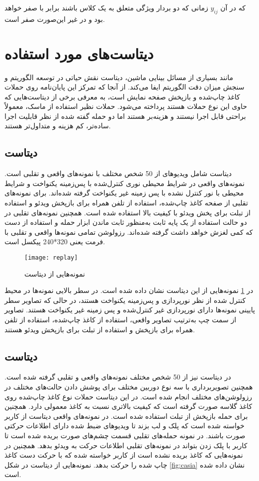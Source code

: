 که در آن 
$y_{ij}$
  زمانی که دو بردار ویژگی متعلق به یک کلاس باشند برابر با صفر خواهد بود و در غیر این‌صورت صفر است.
  \section{دیتاست‌های مورد استفاده}
  مانند بسیاری از مسائل بینایی ماشین، دیتاست نقش حیاتی در توسعه الگوریتم و سنجش میزان دقت الگوریتم ایفا می‌کند. از آنجا که تمرکز این پایان‌نامه روی حملات کاغذ چاپ‌شده و بازپخش صفحه نمایش است، به معرفی برخی از دیتاست‌هایی که حاوی این نوع حملات هستند پرداخته می‌شود. حملات نظیر استفاده از ماسک، معمولاً براحتی قابل اجرا نیستند و هزینه‌بر هستند اما دو حمله گفته شده از نظر قابلیت اجرا ساده‌تر، کم هزینه و متداول‌تر هستند. 
\subsection{دیتاست }
دیتاست
 \cite{chingovska2012effectiveness}
شامل ویدیوهای از 50 شخص مختلف با نمونه‌های واقعی و تقلبی است. نمونه‌های واقعی در شرایط محیطی نوری کنترل‌شده با پس‌زمینه یکنواخت و شرایط محیطی با نور کنترل نشده با پس زمینه غیر یکنواخت گرفته شده‌اند. برای نمونه‌های تقلبی از صفحه کاغذ چاپ‌شده، استفاده از تلفن همراه برای بازپخش ویدئو و استفاده از تبلت  برای پخش ویدئو با کیفیت بالا استفاده شده است. همچنین نمونه‌های تقلبی در دو حالت استفاده از یک پایه ثابت به‌منظور ثابت ماندن ابزار حمله و استفاده از دست که کمی لغزش خواهد داشت گرفته شده‌اند. رزولوشن تمامی نمونه‌ها واقعی و تقلبی با فرمت  یعنی 320*240 پیکسل است.
\begin{figure}[h]
 	\centerline{\texttt{[image: replay]}}
 	\caption{نمونه‌هایی از دیتاست  \cite{chingovska2012effectiveness} }
 	\label{fig:replay}
\end{figure}
در
\ref{fig:replay}
نمونه‌هایی از این دیتاست نشان داده شده است. در سطر بالایی نمونه‌ها در محیط کنترل شده از نظر نورپردازی و پس‌زمینه یکنواخت هستند، در حالی که تصاویر سطر پایینی نمونه‌ها دارای نورپردازی غیر کنترل‌شده و پس زمینه غیر یکنواخت هستند. تصاویر از سمت چپ به‌ترتیب تصاویر واقعی، استفاده از کاغذ چاپ‌شده، استفاده از تلفن همراه برای بازپخش و استفاده از تبلت برای بازپخش ویدئو هستند.
\subsection{دیتاست }
در دیتاست
  \cite{zhang2012face}
نیز از 50 شخص مختلف نمونه‌های واقعی و تقلبی گرفته شده است. همچنین تصویربرداری با سه نوع دوربین مختلف برای پوشش دادن حالت‌های مختلف در رزولوشن‌های مختلف انجام شده است. در این دیتاست حملات نوع کاغذ چاپ‌شده روی کاغذ گلاسه صورت گرفته است که کیفیت بالاتری نسبت به کاغذ معمولی دارد. همچنین برای حمله بازپخش از تبلت استفاده شده است. در نمونه‌های واقعی دیتاست از کاربر خواسته شده است که پلک و لب بزند تا ویدیوهای ضبط شده دارای اطلاعات حرکتی صورت باشند. در نمونه حمله‌های تقلبی قسمت چشم‌های صورت بریده شده است تا کاربر با پلک زدن بتواند در نمونه‌های تقلبی اطلاعات حرکت به ویدئو بدهد. همچنین در نمونه‌هایی که کاغذ بریده نشده است از کاربر خواسته شده که با حرکت دست کاغذ چاپ شده را حرکت بدهد. نمونه‌هایی از دیتاست  در شکل 
\ref{fig:casia}
نشان داده شده است.


